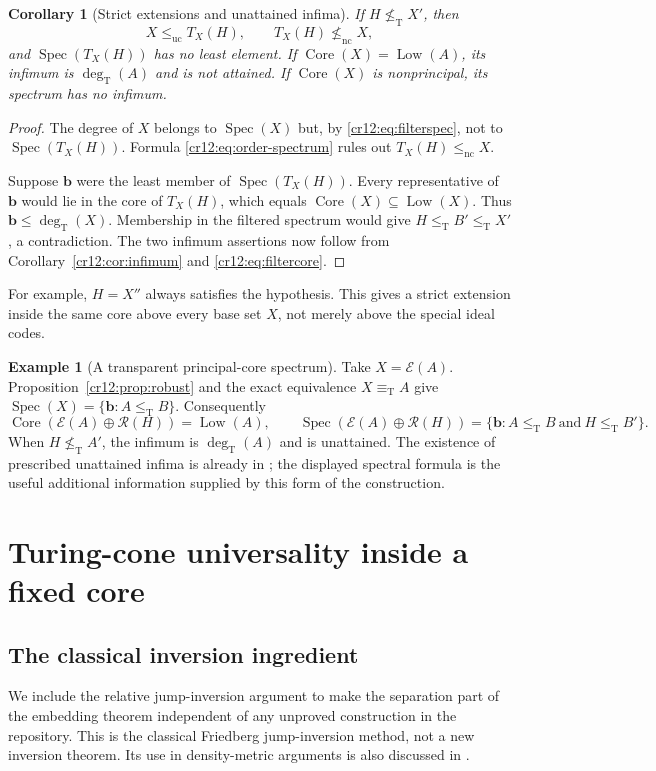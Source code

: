 \documentclass[11pt,letterpaper]{article}
\theoremstyle{plain}
\newtheorem{corollary}[theorem]{Corollary}
\theoremstyle{definition}
\newtheorem{example}[theorem]{Example}
\theoremstyle{remark}
\numberwithin{equation}{section}
\newcommand{\leT}{\leq_{\mathrm T}}
\newcommand{\nleT}{\nleq_{\mathrm T}}
\newcommand{\eqT}{\equiv_{\mathrm T}}
\newcommand{\leuc}{\leq_{\mathrm{uc}}}
\newcommand{\lenc}{\leq_{\mathrm{nc}}}
\newcommand{\Core}{\operatorname{Core}}
\newcommand{\Low}{\operatorname{Low}}
\newcommand{\Spec}{\operatorname{Spec}}
\newcommand{\degT}{\deg_{\mathrm T}}
\newcommand{\Rcode}{\mathcal R}
\newcommand{\Ecode}{\mathcal E}
\begin{document}
\begin{corollary}[Strict extensions and unattained infima]\label{cr12:cor:strict}
If $H\nleT X'$, then
\[
 X\leuc T_X(H),\qquad T_X(H)\not\lenc X,
\]
and $\Spec(T_X(H))$ has no least element. If
$\Core(X)=\Low(A)$, its infimum is $\degT(A)$ and is not attained.
If $\Core(X)$ is nonprincipal, its spectrum has no infimum.
\end{corollary}
\begin{proof}
The degree of $X$ belongs to $\Spec(X)$ but, by
\eqref{cr12:eq:filterspec}, not to $\Spec(T_X(H))$. Formula
\eqref{cr12:eq:order-spectrum} rules out $T_X(H)\lenc X$.

Suppose $\mathbf b$ were the least member of $\Spec(T_X(H))$.
Every representative of $\mathbf b$ would lie in the core of $T_X(H)$,
which equals $\Core(X)\subseteq\Low(X)$. Thus $\mathbf b\le\degT(X)$.
Membership in the filtered spectrum would give
$H\leT B'\leT X'$, a contradiction. The two infimum assertions now follow
from Corollary~\ref{cr12:cor:infimum} and \eqref{cr12:eq:filtercore}.
\end{proof}

For example, $H=X''$ always satisfies the hypothesis. This gives a strict
extension inside the same core above every base set $X$, not merely above the
special ideal codes.

\begin{example}[A transparent principal-core spectrum]\label{cr12:ex:principal-filter}
Take $X=\Ecode(A)$. Proposition~\ref{cr12:prop:robust} and the exact equivalence
$X\eqT A$ give $\Spec(X)=\{\mathbf b:A\leT B\}$. Consequently
\[
 \Core(\Ecode(A)\oplus\Rcode(H))=\Low(A),\qquad
 \Spec(\Ecode(A)\oplus\Rcode(H))
 =\{\mathbf b:A\leT B\ \text{and}\ H\leT B'\}.
\]
When $H\nleT A'$, the infimum is $\degT(A)$ and is unattained. The existence
of prescribed unattained infima is already in \cite{Repo}; the displayed
spectral formula is the useful additional information supplied by this form of
the construction.
\end{example}

\section{Turing-cone universality inside a fixed core}\label{cr12:sec:embedding}
\subsection{The classical inversion ingredient}
We include the relative jump-inversion argument to make the separation part
of the embedding theorem independent of any unproved construction in the
repository. This is the classical Friedberg jump-inversion method, not a new
inversion theorem. Its use in density-metric arguments is also discussed in
\cite[Section~3]{HJS}.
\end{document}
